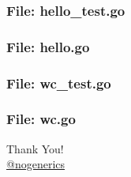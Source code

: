 \documentclass[aspectratio=169]{beamer}
\begin{document}
\begin{frame}[fragile]
  \frametitle{File: hello\_test.go}

  

\end{frame}


\begin{frame}[fragile]
  \frametitle{File: hello.go}

  

\end{frame}


\begin{frame}[fragile]
  \frametitle{File: wc\_test.go}

  

\end{frame}

\begin{frame}[fragile]
  \frametitle{File: wc.go}

  

\end{frame}

\begin{frame}%
\begin{center}
{\huge Thank You!}\\[1cm]
{\large \href{https://twitter.com/nogenerics}{@nogenerics}}
\end{center}
\end{frame}
\end{document}
